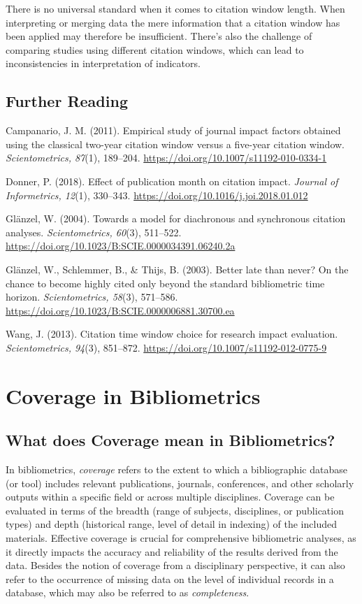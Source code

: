 \documentclass[
  letterpaper,
]{scrreprt}
\begin{document}
There is no universal standard when it comes to citation window length.
When interpreting or merging data the mere information that a citation
window has been applied may therefore be insufficient. There's also the
challenge of comparing studies using different citation windows, which
can lead to inconsistencies in interpretation of indicators.

\section{Further Reading}\label{further-reading-1}

Campanario, J. M. (2011). Empirical study of journal impact factors
obtained using the classical two-year citation window versus a five-year
citation window. \emph{Scientometrics, 87}(1), 189--204.
\url{https://doi.org/10.1007/s11192-010-0334-1}

Donner, P. (2018). Effect of publication month on citation impact.
\emph{Journal of Informetrics, 12}(1), 330--343.
\url{https://doi.org/10.1016/j.joi.2018.01.012}

Glänzel, W. (2004). Towards a model for diachronous and synchronous
citation analyses. \emph{Scientometrics, 60}(3), 511--522.
\url{https://doi.org/10.1023/B:SCIE.0000034391.06240.2a}

Glänzel, W., Schlemmer, B., \& Thijs, B. (2003). Better late than never?
On the chance to become highly cited only beyond the standard
bibliometric time horizon. \emph{Scientometrics, 58}(3), 571--586.
\url{https://doi.org/10.1023/B:SCIE.0000006881.30700.ea}

Wang, J. (2013). Citation time window choice for research impact
evaluation. \emph{Scientometrics, 94}(3), 851--872.
\url{https://doi.org/10.1007/s11192-012-0775-9}

\chapter{Coverage in Bibliometrics}\label{coverage-in-bibliometrics}

\section{What does Coverage mean in
Bibliometrics?}\label{what-does-coverage-mean-in-bibliometrics}

In bibliometrics, \emph{coverage} refers to the extent to which a
bibliographic database (or tool) includes relevant publications,
journals, conferences, and other scholarly outputs within a specific
field or across multiple disciplines. Coverage can be evaluated in terms
of the breadth (range of subjects, disciplines, or publication types)
and depth (historical range, level of detail in indexing) of the
included materials. Effective coverage is crucial for comprehensive
bibliometric analyses, as it directly impacts the accuracy and
reliability of the results derived from the data. Besides the notion of
coverage from a disciplinary perspective, it can also refer to the
occurrence of missing data on the level of individual records in a
database, which may also be referred to as \emph{completeness}.
\end{document}
